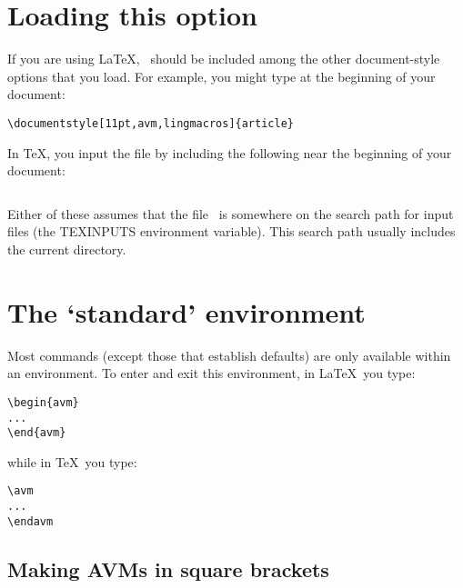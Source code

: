 \section{Loading this option}

If you are using \LaTeX, \av\ should be included among the other
document-style options that you load.  For example, you might type
at the beginning of your document:
%
\begin{example}
\begin{verbatim}
\documentstyle[11pt,avm,lingmacros]{article}
\end{verbatim}
\end{example}

In \TeX, you input the file by including the following near the beginning
of your document:
\begin{example}
\begin{verbatim}

\end{verbatim}
\end{example}
Either of these assumes that the file \av\ is somewhere on the search path for
input files (the TEXINPUTS environment variable).  This search path usually
includes the current directory.

\section{The `standard' environment}

Most commands (except those that establish defaults) are only available
within an {\AVM} environment.  To enter and exit this environment, in \LaTeX\
you type:
\begin{example}
\begin{verbatim}
\begin{avm}
...
\end{avm}
\end{verbatim}
\end{example}
while in \TeX\ you type:
\begin{example}
\begin{verbatim}
\avm
...
\endavm
\end{verbatim}
\end{example}

\subsection{Making AVMs in square brackets}

